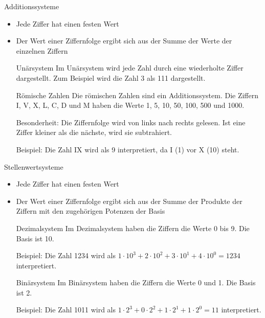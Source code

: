 \documentclass[xelatex,aspectratio=169]{beamer}
\begin{document}
\begin{frame}{Additionssysteme}
  \begin{itemize}
    \item Jede Ziffer hat einen festen Wert
    \item Der Wert einer Ziffernfolge ergibt sich aus der Summe der Werte der einzelnen Ziffern
          \begin{exampleblock}{Unärsystem}
            Im Unärsystem wird jede Zahl durch eine wiederholte Ziffer dargestellt. Zum Beispiel wird die Zahl 3 als 111 dargestellt.
          \end{exampleblock}
          \begin{exampleblock}{Römische Zahlen}
            Die römischen Zahlen sind ein Additionssystem. Die Ziffern I, V, X, L, C, D und M haben die Werte 1, 5, 10, 50, 100, 500 und 1000.

            Besonderheit: Die Ziffernfolge wird von links nach rechts gelesen. Ist eine Ziffer kleiner als die nächste, wird sie subtrahiert.

            Beispiel: Die Zahl IX wird als 9 interpretiert, da I (1) vor X (10) steht.
          \end{exampleblock}
  \end{itemize}
\end{frame}

\begin{frame}{Stellenwertsysteme}
  \begin{itemize}
    \item Jede Ziffer hat einen festen Wert
    \item Der Wert einer Ziffernfolge ergibt sich aus der Summe der Produkte der Ziffern mit den zugehörigen Potenzen der Basis
          \begin{exampleblock}{Dezimalsystem}
            Im Dezimalsystem haben die Ziffern die Werte 0 bis 9. Die Basis ist 10.

            Beispiel: Die Zahl 1234 wird als $1 \cdot 10^3 + 2 \cdot 10^2 + 3 \cdot 10^1 + 4 \cdot 10^0 = 1234$ interpretiert.
          \end{exampleblock}
          \begin{exampleblock}{Binärsystem}
            Im Binärsystem haben die Ziffern die Werte 0 und 1. Die Basis ist 2.

            Beispiel: Die Zahl 1011 wird als $1 \cdot 2^3 + 0 \cdot 2^2 + 1 \cdot 2^1 + 1 \cdot 2^0 = 11$ interpretiert.
          \end{exampleblock}
  \end{itemize}
\end{frame}
\end{document}

